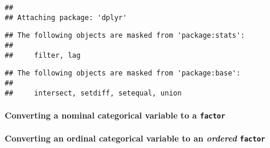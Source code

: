 \documentclass[]{article}
\newenvironment{Shaded}{\begin{snugshade}}{\end{snugshade}}
\newcommand{\KeywordTok}[1]{\textcolor[rgb]{0.13,0.29,0.53}{\textbf{#1}}}
\newcommand{\DataTypeTok}[1]{\textcolor[rgb]{0.13,0.29,0.53}{#1}}
\newcommand{\StringTok}[1]{\textcolor[rgb]{0.31,0.60,0.02}{#1}}
\newcommand{\OtherTok}[1]{\textcolor[rgb]{0.56,0.35,0.01}{#1}}
\newcommand{\OperatorTok}[1]{\textcolor[rgb]{0.81,0.36,0.00}{\textbf{#1}}}
\newcommand{\NormalTok}[1]{#1}
\let\oldparagraph\paragraph
\renewcommand{\paragraph}[1]{\oldparagraph{#1}\mbox{}}
\begin{document}
\begin{verbatim}
## 
## Attaching package: 'dplyr'
\end{verbatim}

\begin{verbatim}
## The following objects are masked from 'package:stats':
## 
##     filter, lag
\end{verbatim}

\begin{verbatim}
## The following objects are masked from 'package:base':
## 
##     intersect, setdiff, setequal, union
\end{verbatim}

\paragraph{\texorpdfstring{Converting a nominal categorical variable to
a
\texttt{factor}}{Converting a nominal categorical variable to a factor}}\label{converting-a-nominal-categorical-variable-to-a-factor}

\begin{Shaded}
\end{Shaded}

\paragraph{\texorpdfstring{Converting an ordinal categorical variable to
an \emph{ordered}
\texttt{factor}}{Converting an ordinal categorical variable to an ordered factor}}\label{converting-an-ordinal-categorical-variable-to-an-ordered-factor}

\begin{Shaded}
\end{Shaded}
\end{document}
